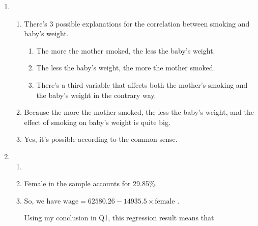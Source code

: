 \documentclass{article}
\begin{document}
\begin{enumerate}
\begin{enumerate}
\begin{proof}
\begin{equation}
\begin{aligned}
                    &=\frac{\mathbb{E}[y|x_1=1]P(x_1=1)-\mathbb{E}[y|x_1=0]P(x_1=1)}{P(x_1=1)} \\
                    &=\mathbb{E}[y|x_1=1]-\mathbb{E}[y|x_1=0] \\
                \end{aligned}
                \nonumber
            \end{equation}
        \end{proof}
    \end{enumerate}
    \item \begin{enumerate}
        \item There's 3 possible explanations for the correlation between smoking and baby's weight.
        \begin{enumerate}
            \item The more the mother smoked, the less the baby's weight.
            \item The less the baby's weight, the more the mother smoked.
            \item There's a third variable that affects both the mother's smoking and the baby's weight in the contrary way.
        \end{enumerate}
        \item Because the more the mother smoked, the less the baby's weight, and the effect of smoking on baby's weight is quite big.
        \item Yes, it's possible according to the common sense.
    \end{enumerate}
    \item \begin{enumerate}
        \item \begin{stlog}
            
        \end{stlog}
        \item \begin{stlog}
            
        \end{stlog} \par
        Female in the sample accounts for 29.85\%.
        \item \begin{stlog}
            
        \end{stlog} \par
        So, we have $\text{wage}=62580.26-14935.5\times\text{female}$ . \par
        Using my conclusion in Q1, this regression result means that 

\end{enumerate}
\end{enumerate}
\end{document}
